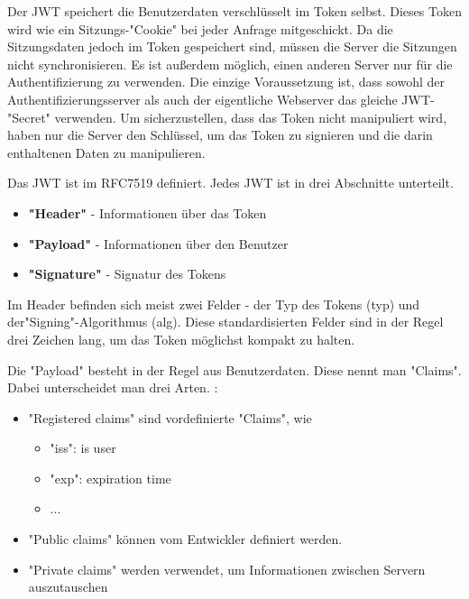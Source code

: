 \label{sec:jwt}

Der JWT speichert die Benutzerdaten verschlüsselt im Token selbst. Dieses Token wird wie ein Sitzungs-"Cookie" bei jeder Anfrage mitgeschickt. 
Da die Sitzungsdaten jedoch im Token gespeichert sind, müssen die Server die Sitzungen nicht synchronisieren. 
Es ist außerdem möglich, einen anderen Server nur für die Authentifizierung zu verwenden. 
Die einzige Voraussetzung ist, dass sowohl der Authentifizierungsserver als auch der eigentliche Webserver das gleiche JWT-"Secret" verwenden. 
Um sicherzustellen, dass das Token nicht manipuliert wird, haben nur die Server den Schlüssel, um das Token zu signieren und die darin enthaltenen Daten zu manipulieren. \cite{Auth0JWT}

Das JWT ist im RFC7519 definiert. Jedes JWT ist in drei Abschnitte\cite{Auth0JWT} unterteilt. 

\begin{itemize}
    \item \textbf{"Header"} - Informationen über das Token
    \item \textbf{"Payload"} - Informationen über den Benutzer
    \item \textbf{"Signature"} - Signatur des Tokens
\end{itemize}

Im Header befinden sich meist zwei Felder - der Typ des Tokens ({\ttfamily typ}) und der\linebreak"Signing"-Algorithmus ({\ttfamily alg}). 
Diese standardisierten Felder sind in der Regel drei Zeichen lang, um das Token möglichst kompakt zu halten. \cite{Auth0JWT}

Die "Payload" besteht in der Regel aus Benutzerdaten. Diese nennt man "Claims". Dabei unterscheidet man drei Arten. \cite{Auth0JWT}: 

\begin{itemize}
    \item "Registered claims" sind vordefinierte "Claims", wie
    \begin{itemize}
        \item "iss": is user
        \item "exp":  expiration time
        \item ...
    \end{itemize}
    \item "Public claims" können vom Entwickler definiert werden.
    \item "Private claims" werden verwendet, um Informationen zwischen Servern aus\-zu\-tauschen
\end{itemize}

